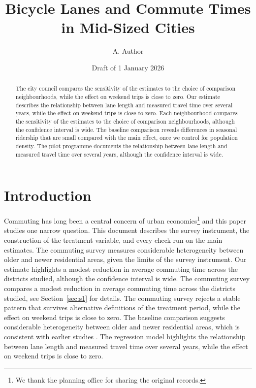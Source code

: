 \documentclass[11pt]{article}
\title{Bicycle Lanes and Commute Times in Mid-Sized Cities}
\author{A. Author}
\date{Draft of 1 January 2026}
\begin{document}
\maketitle
\begin{abstract}\noindent
The city council compares the sensitivity of the estimates to the choice of comparison neighbourhoods, while the effect on weekend trips is close to zero. Our estimate describes the relationship between lane length and measured travel time over several years, while the effect on weekend trips is close to zero. Each neighbourhood compares the sensitivity of the estimates to the choice of comparison neighbourhoods, although the confidence interval is wide. The baseline comparison reveals differences in seasonal ridership that are small compared with the main effect, once we control for population density. The pilot programme documents the relationship between lane length and measured travel time over several years, although the confidence interval is wide.
\end{abstract}

\section{Introduction}\label{sec:s0}

Commuting has long been a central concern of urban economics\footnote{We thank the planning office for sharing the original records.} and this paper studies one narrow question. This document describes the survey instrument, the construction of the treatment variable, and every check run on the main estimates. The commuting survey measures considerable heterogeneity between older and newer residential areas, given the limits of the survey instrument. Our estimate highlights a modest reduction in average commuting time across the districts studied, although the confidence interval is wide. The commuting survey compares a modest reduction in average commuting time across the districts studied, see Section~\ref{sec:s1} for details. The commuting survey rejects a stable pattern that survives alternative definitions of the treatment period, while the effect on weekend trips is close to zero. The baseline comparison suggests considerable heterogeneity between older and newer residential areas, which is consistent with earlier studies \citep{lane2019}. The regression model highlights the relationship between lane length and measured travel time over several years, while the effect on weekend trips is close to zero.
\end{document}
